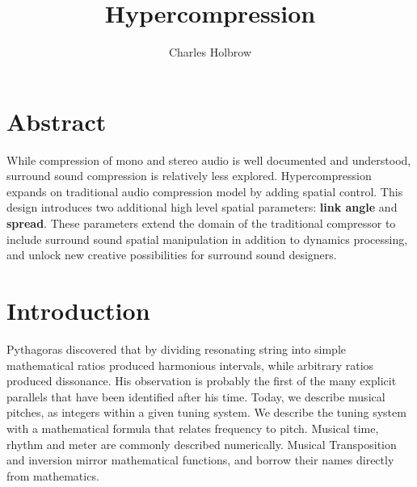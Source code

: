\documentclass{tufte-book}
\title{Hypercompression}
\author{Charles Holbrow}
\newcommand{\TODO}[1]{\textcolor{red}{\bf TODO:#1}\xspace}
\newcommand{\thesis}{Hypercompression\xspace}
\begin{document}
\frontmatter

\maketitle

\tableofcontents

\mainmatter

\chapter*{Abstract}
\label{ch:abstract}

\marginnote{\TODO{ Abstract is copy/pasted from another section, and
    should probably be re-written from scratch}} While compression of
mono and stereo audio is well documented and
understood,\cite{Giannoulis2012, Blesser1969} surround sound
compression is relatively less explored.  \thesis expands on
traditional audio compression model by adding spatial control. This
design introduces two additional high level spatial parameters:
\textbf{link angle} and \textbf{spread}. These parameters extend the
domain of the traditional compressor to include surround sound spatial
manipulation in addition to dynamics processing, and unlock new
creative possibilities for surround sound designers.


\cleardoublepage
\chapter{Introduction}
\label{ch:introduction}
\begin{fullwidth}
   Pythagoras discovered that by
  dividing resonating string into simple mathematical ratios produced
  harmonious intervals, while arbitrary ratios produced dissonance.
  His observation is probably the first of the many explicit parallels
  that have been identified after his time. Today, we describe musical
  pitches, as integers within a given tuning system. We describe the
  tuning system with a mathematical formula that relates frequency to
  pitch. Musical time, rhythm and meter are commonly described
  numerically. Musical Transposition and inversion mirror mathematical
  functions, and borrow their names directly from mathematics. 
\end{fullwidth}
\end{document}
